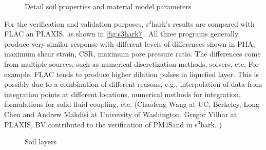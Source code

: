 \begin{figure}[!htbp]
  \centering 
    
  \caption{Detail soil properties and material model parameters}
  \label{fig:s3hark6}
\end{figure}

For the verification and validation purposes, s$^3$hark's results are compared with FLAC an PLAXIS, as shown in \autoref{fig:s3hark7}. 
All three programs generally produce very similar response with
different levels of differences shown in PHA, maximum shear strain, CSR, maximum pore pressure ratio. 
The differences come from multiple sources, such as numerical discretization methods, solvers, etc.
For example, FLAC tends to produce higher dilation pulses in liquefied layer. 
This is possibly due to a combination of different reasons, e.g.,
interpolation of data from integration points at different
locations, numerical methods for integration, formulations for
solid fluid coupling, etc.
(Chaofeng Wang at UC, Berkeley, Long Chen and Andrew Makdisi at University of Washington,  
Gregor Vilhar at PLAXIS, BV contributed to the verification of PM4Sand in s$^3$hark. )

\begin{figure}[!htbp]
  \caption{Soil layers }
  \label{fig:s3hark7}
\end{figure}





